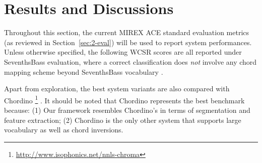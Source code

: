 \section{Results and Discussions} \label{sec:3-res}




Throughout this section, the current MIREX ACE standard evaluation metrics (as reviewed in Section~\ref{sec:2-eval}) will be used to report system performances. Unless otherwise specified, the following WCSR scores are all reported under SeventhsBass evaluation, where a correct classification does {\it not} involve any chord mapping scheme beyond SeventhsBass vocabulary \cite{pauwels2013evaluating,burgoyne2014comparative}.

Apart from exploration, the best system variants are also compared with Chordino \footnote{\url{http://www.isophonics.net/nnls-chroma}} \cite{cannam2010sonic}. It should be noted that Chordino represents the best benchmark because: (1) Our framework resembles Chordino's in terms of segmentation and feature extraction; (2) Chordino is the only other system that supports large vocabulary as well as chord inversions.

